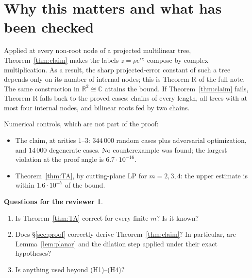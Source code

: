 \documentclass[11pt]{amsart}
\theoremstyle{definition}
\newtheorem*{question}{Questions for the reviewer}
\newcommand{\R}{\mathbb{R}}
\begin{document}
\section{Why this matters and what has been checked}

Applied at every non-root node of a projected multilinear tree, Theorem~\ref{thm:claim}
makes the labels $z=\rho e^{i\chi}$ compose by complex multiplication. As a result,
the sharp projected-error constant of such a tree depends only on its number of
internal nodes; this is Theorem R of the full note. The same construction in
$\R^2\cong\mathbb C$ attains the bound. If Theorem~\ref{thm:claim} fails, Theorem R
falls back to the proved cases: chains of every length, all trees with at most four
internal nodes, and bilinear roots fed by two chains.

Numerical controls, which are not part of the proof:
\begin{itemize}
\item The claim, at arities $1$--$3$: $344\,000$ random cases plus adversarial
  optimization, and $14\,000$ degenerate cases. No counterexample was found; the
  largest violation at the proof angle is $6.7\cdot10^{-16}$.
\item Theorem~\ref{thm:TA}, by cutting-plane LP for $m=2,3,4$: the upper estimate is
  within $1.6\cdot10^{-7}$ of the bound.
\end{itemize}

\begin{question}
\begin{enumerate}[label=\textup{(\arabic*)}]
\item Is Theorem~\ref{thm:TA} correct for every finite $m$? Is it known?
\item Does \S\ref{sec:proof} correctly derive Theorem~\ref{thm:claim}? In particular,
  are Lemma~\ref{lem:planar} and the dilation step applied under their exact
  hypotheses?
\item Is anything used beyond (H1)--(H4)?
\end{enumerate}
\end{question}
\end{document}
